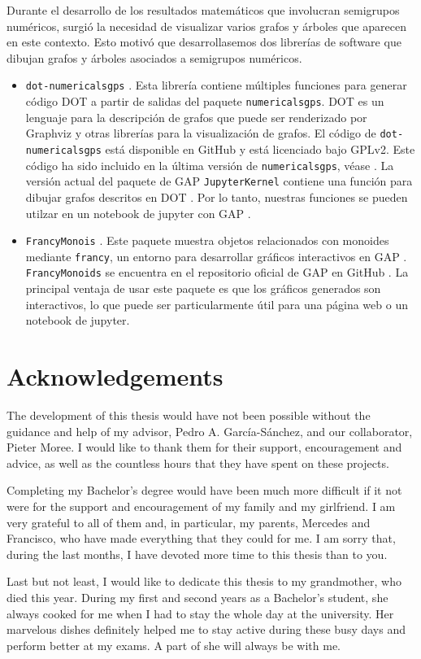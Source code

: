 Durante el desarrollo de los resultados matemáticos que involucran semigrupos numéricos, surgió la necesidad de visualizar varios grafos y árboles que aparecen en este contexto. Esto motivó que desarrollasemos dos librerías de software que dibujan grafos y árboles asociados a semigrupos numéricos.

\begin{itemize}
\item \texttt{dot-numericalsgps} \cite{dot-numericalsgps}. Esta librería contiene múltiples funciones para generar código DOT a partir de salidas del paquete \texttt{numericalsgps}. DOT es un lenguaje para la descripción de grafos \cite{dot} que puede ser renderizado por Graphviz \cite{graphviz} y otras librerías para la visualización de grafos. El código de \texttt{dot-numericalsgps} está disponible en GitHub \cite{dot-numericalsgps} y está licenciado bajo GPLv2. Este código ha sido incluido en la última versión de \texttt{numericalsgps}, véase \cite[manual, capítulo 14]{numericalsgps}. La versión actual del paquete de GAP \texttt{JupyterKernel} contiene una función para dibujar grafos descritos en DOT \cite{gap-jupyter} . Por lo tanto, nuestras funciones se pueden utilzar en un notebook de jupyter con GAP \cite{jupyter}.
\item \texttt{FrancyMonois} \cite{francy-monoids}. Este paquete muestra objetos relacionados con monoides mediante \texttt{francy}, un entorno para desarrollar gráficos interactivos en GAP \cite{francy}. \texttt{FrancyMonoids} se encuentra en el repositorio oficial de GAP en GitHub \cite{francy-monoids}. La principal ventaja de usar este paquete es que los gráficos generados son interactivos, lo que puede ser particularmente útil para una página web o un notebook de jupyter.
\end{itemize}

\newpage
\thispagestyle{plain}


\chapter*{Acknowledgements}

The development of this thesis would have not been possible without the guidance and help of my advisor, Pedro A. García-Sánchez, and our collaborator, Pieter Moree. I would like to thank them for their support, encouragement and advice, as well as the countless hours that they have spent on these projects. 

Completing my Bachelor's degree would have been much more difficult if it not were for the support and encouragement of my family and my girlfriend. I am very grateful to all of them and, in particular, my parents, Mercedes and Francisco, who have made everything that they could for me. I am sorry that, during the last months, I have devoted more time to this thesis than to you.

Last but not least, I would like to dedicate this thesis to my grandmother, who died this year. During my first and second years as a Bachelor's student, she always cooked for me when I had to stay the whole day at the university. Her marvelous dishes definitely helped me to stay active during these busy days and perform better at my exams. A part of she will always be with me.
